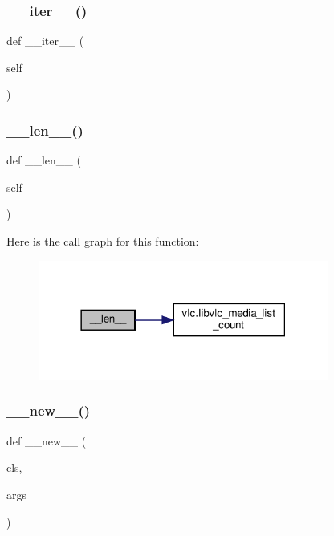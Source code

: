 \subsubsection{\texorpdfstring{\+\_\+\+\_\+iter\+\_\+\+\_\+()}{\_\_iter\_\_()}}
{\footnotesize\ttfamily def \+\_\+\+\_\+iter\+\_\+\+\_\+ (\begin{DoxyParamCaption}\item[{}]{self }\end{DoxyParamCaption})}

\mbox{\label{classvlc_1_1_media_list_a810fdc262754b6d21f5acd0e280d4daf}} 
\subsubsection{\texorpdfstring{\+\_\+\+\_\+len\+\_\+\+\_\+()}{\_\_len\_\_()}}
{\footnotesize\ttfamily def \+\_\+\+\_\+len\+\_\+\+\_\+ (\begin{DoxyParamCaption}\item[{}]{self }\end{DoxyParamCaption})}

Here is the call graph for this function\+:
\nopagebreak
\begin{figure}[H]
\begin{center}
\leavevmode
\includegraphics[width=270pt]{classvlc_1_1_media_list_a810fdc262754b6d21f5acd0e280d4daf_cgraph}
\end{center}
\end{figure}
\mbox{\label{classvlc_1_1_media_list_acc2aa3fac6a63e8bac4f19efc327102b}} 
\subsubsection{\texorpdfstring{\+\_\+\+\_\+new\+\_\+\+\_\+()}{\_\_new\_\_()}}
{\footnotesize\ttfamily def \+\_\+\+\_\+new\+\_\+\+\_\+ (\begin{DoxyParamCaption}\item[{}]{cls,  }\item[{}]{args }\end{DoxyParamCaption})}

